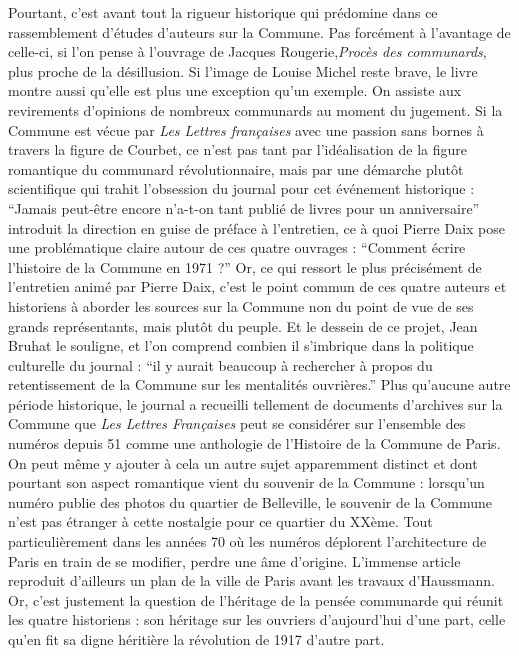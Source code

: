 	Pourtant, c’est avant tout la rigueur historique qui prédomine dans ce rassemblement d’études d’auteurs sur la Commune. Pas forcément à l’avantage de celle-ci, si l’on pense à l’ouvrage de Jacques Rougerie,\emph{Procès des communards}, plus proche de la désillusion. Si l’image de Louise Michel reste brave, le livre montre aussi qu’elle est plus une exception qu’un exemple. On assiste aux revirements d’opinions de nombreux communards au moment du jugement. Si la Commune est vécue par \emph{Les Lettres françaises} avec une passion sans bornes à travers la figure de Courbet, ce n’est pas tant par l’idéalisation de la figure romantique du communard révolutionnaire, mais par une démarche plutôt scientifique qui trahit l’obsession du journal pour cet événement historique : \enquote{Jamais peut-être encore n’a-t-on tant publié de livres pour un anniversaire} introduit la direction en guise de préface à l’entretien, ce à quoi Pierre Daix pose une problématique claire autour de ces quatre ouvrages : \enquote{Comment écrire l’histoire de la Commune en 1971 ?} Or, ce qui ressort le plus précisément de l’entretien animé par Pierre Daix, c’est le point commun de ces quatre auteurs et historiens à aborder les sources sur la Commune non du point de vue de ses grands représentants, mais plutôt du peuple. Et le dessein de ce projet, Jean Bruhat le souligne, et l’on comprend combien il s’imbrique dans la politique culturelle du journal : \enquote{il y aurait beaucoup à rechercher à propos du retentissement de la Commune sur les mentalités ouvrières.}
	Plus qu’aucune autre période historique, le journal a recueilli tellement de documents d’archives sur la Commune que \emph{Les Lettres Françaises} peut se considérer sur l’ensemble des numéros depuis 51 comme une anthologie de l’Histoire de la Commune de Paris. On peut même y ajouter à cela un autre sujet apparemment distinct et dont pourtant son aspect romantique vient du souvenir de la Commune : lorsqu’un numéro publie des photos du quartier de Belleville, le souvenir de la Commune n’est pas étranger à cette nostalgie pour ce quartier du XXème. Tout particulièrement dans les années 70 où les numéros déplorent l’architecture de Paris en train de se modifier, perdre une âme d’origine. L’immense article reproduit d’ailleurs un plan de la ville de Paris avant les travaux d’Haussmann. Or, c’est justement la question de l’héritage de la pensée communarde qui réunit les quatre historiens : son héritage sur les ouvriers d’aujourd’hui d’une part, celle qu’en fit sa digne héritière la révolution de 1917 d’autre part. 


